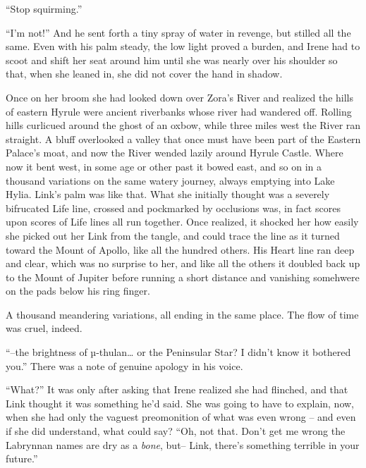 \documentclass[../FGP.tex]{subfiles}
\begin{document}
 ``Stop squirming.''

 ``I'm not!'' And he sent forth a tiny spray of water in revenge, but stilled all the same. Even with his palm steady, the low light proved a burden, and Irene had to scoot and shift her seat around him until she was nearly over his shoulder so that, when she leaned in, she did not cover the hand in shadow.

Once on her broom she had looked down over Zora's River and realized the hills of eastern Hyrule were ancient riverbanks whose river had wandered off.%
    \normalmarginpar{}
Rolling hills curl\-i\-cued around the ghost of an oxbow, while three miles west the River ran straight. A bluff overlooked a valley that once must have been part of the Eastern Palace's moat, and now the River wended lazily around Hyrule Castle. Where now it bent west, in some age or other past it bowed east, and so on in a thousand variations on the same watery journey, always emptying into Lake Hylia. Link's palm was like that. What she initially thought was a severely bifrucated Life line, crossed and pockmarked by occlusions was, in  fact scores upon scores of Life lines all run together. Once realized, it shocked her how easily she picked out her Link from the tangle, and could trace the line as it turned toward the Mount of Apollo, like all the hundred others. His Heart line ran deep and clear, which was no surprise to her, and like all the others it doubled back up to the Mount of Jupiter before running a short distance and vanishing somehwere on the pads below his ring finger. 

A thousand meandering variations, all ending in the same place. The flow of time was cruel, indeed.

\normalmarginpar``--the brightness of {\Gr µ}-thulan\ldots{} or the Peninsular Star? I didn't know it bothered you.'' There was a note of genuine apology in his voice.

``What?'' It was only after asking that Irene realized she had flinched, and that Link thought it was something he'd said. She was going to have to explain, now, when she had only the vaguest preomonition of what was even wrong -- and even if she did understand, what could say? ``Oh, not that. Don't get me wrong the Labrynnan names are dry as a \emph{bone}, but-- Link, there's something terrible in your future.''  
\end{document}
